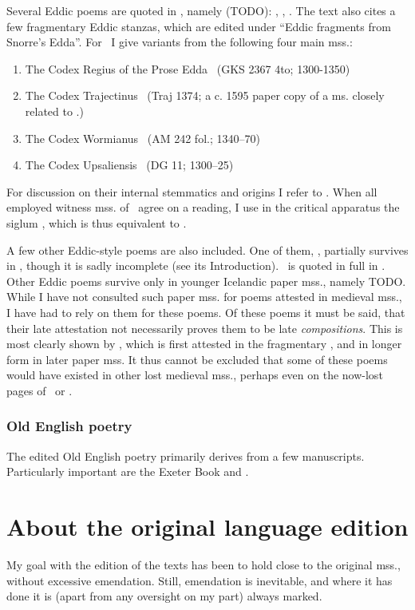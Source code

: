     Several Eddic poems are quoted in \Gylfaginning, namely (TODO): \Voluspa, \Vafthrudnismal, \Grimnismal.  The text also cites a few fragmentary Eddic stanzas, which are edited under “Eddic fragments from Snorre’s Edda”.  For \Gylfaginning\ I give variants from the following four main mss.:
    \begin{enumerate}
      \item The Codex Regius of the Prose Edda \RegiusProse\ (GKS 2367 4to; 1300-1350)
      \item The Codex Trajectinus \Trajectinus\ (Traj 1374; a c. 1595 paper copy of a ms. closely related to \RegiusProse.)
      \item The Codex Wormianus \Wormianus\ (AM 242 fol.; 1340–70)
      \item The Codex Upsaliensis \Upsaliensis\ (DG 11; 1300–25)
    \end{enumerate}

    For discussion on their internal stemmatics and origins I refer to \textcite{Haukur2017}.  When all employed witness mss. of \Gylfaginning\ agree on a reading, I use in the critical apparatus the siglum \GylfMS, which is thus equivalent to \RegiusProse\Trajectinus\Wormianus\Upsaliensis.

    A few other Eddic-style poems are also included.  One of them, \Rigsthula, partially survives in \Wormianus, though it is sadly incomplete (see its Introduction).  \Grottasongr\ is quoted in full in \Skaldskaparmal.  Other Eddic poems survive only in younger Icelandic paper mss., namely TODO.  While I have not consulted such paper mss. for poems attested in medieval mss., I have had to rely on them for these poems.  Of these poems it must be said, that their late attestation not necessarily proves them to be late \emph{compositions}.  This is most clearly shown by \Baldrsdraumar, which is first attested in the fragmentary \AM, and in longer form in later paper mss.  It thus cannot be excluded that some of these poems would have existed in other lost medieval mss., perhaps even on the now-lost pages of \Regius\ or \AM.

    \subsubsection{Old English poetry}

    The edited Old English poetry primarily derives from a few manuscripts.  Particularly important are the Exeter Book and \Lacnunga.


\section{About the original language edition}
  My goal with the edition of the texts has been to hold close to the original mss., without excessive emendation.  Still, emendation is inevitable, and where it has done it is (apart from any oversight on my part) always marked.

